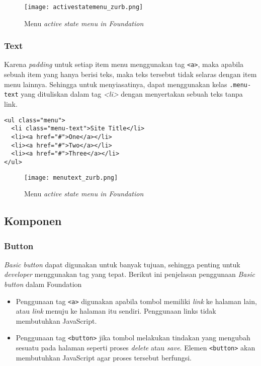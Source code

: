 \begin{figure} [H]
	\centering  
	\texttt{[image: activestatemenu\_zurb.png]}  
	\caption{Menu \textit{active state menu in Foundation}}
\end{figure}


\subsubsection{Text}
Karena \textit{padding} untuk setiap item menu menggunakan tag \texttt{<a>}, maka apabila sebuah item yang hanya berisi teks, maka teks tersebut tidak selaras dengan item menu lainnya. Sehingga untuk menyiasatinya, dapat menggunakan kelas \texttt{.menu-text} yang dituliskan dalam tag \textit{<li>} dengan menyertakan sebuah teks tanpa link.

\begin{lstlisting}[frame=single]
 <ul class="menu">
  <li class="menu-text">Site Title</li>
  <li><a href="#">One</a></li>
  <li><a href="#">Two</a></li>
  <li><a href="#">Three</a></li>
</ul>
\end{lstlisting}

\begin{figure} [H]
	\centering  
	\texttt{[image: menutext\_zurb.png]}  
	\caption{Menu \textit{active state menu in Foundation}}
\end{figure}

\subsection{Komponen}
 
\subsubsection{Button}
\textit{Basic button} dapat digunakan untuk banyak tujuan, sehingga penting untuk \textit{developer} menggunakan tag yang tepat. Berikut ini penjelasan penggunaan \textit{Basic button} dalam Foundation
\begin{itemize}
  \item Penggunaan tag \texttt{<a>} digunakan apabila tombol memiliki \textit{link} ke halaman lain, atau \textit{link} menuju ke halaman itu sendiri. Penggunaan links tidak membutuhkan JavaScript.
  \item Penggunaan tag \texttt{<button>} jika tombol melakukan tindakan yang mengubah sesuatu pada halaman seperti proses \textit{delete} atau \textit{save}. Elemen \texttt{<button>} akan membutuhkan JavaScript agar proses tersebut berfungsi. 
\end{itemize}

